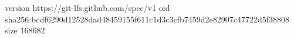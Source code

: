 version https://git-lfs.github.com/spec/v1
oid sha256:bcdf6290d12528dad48459155f611c1d3c3cfb7459d2e82907c47722d5f38808
size 168682
